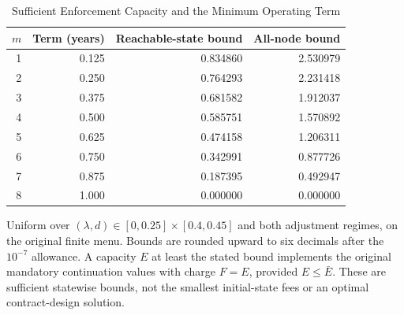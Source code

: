 \begin{table}[tbp]
\centering\small
\caption{Sufficient Enforcement Capacity and the Minimum Operating Term}
\label{tab:r9_enforcement}
\begin{tabular}{rrrr}
\toprule
$m$ & Term (years) & Reachable-state bound & All-node bound \\
\midrule
1 & 0.125 & 0.834860 & 2.530979 \\
2 & 0.250 & 0.764293 & 2.231418 \\
3 & 0.375 & 0.681582 & 1.912037 \\
4 & 0.500 & 0.585751 & 1.570892 \\
5 & 0.625 & 0.474158 & 1.206311 \\
6 & 0.750 & 0.342991 & 0.877726 \\
7 & 0.875 & 0.187395 & 0.492947 \\
8 & 1.000 & 0.000000 & 0.000000 \\
\bottomrule
\end{tabular}
\begin{minipage}{0.98\textwidth}\footnotesize\medskip
Uniform over $(\lambda,d)\in[0,0.25]\times[0.4,0.45]$ and both adjustment regimes, on the original finite menu. Bounds are rounded upward to six decimals after the $10^{-7}$ allowance. A capacity $E$ at least the stated bound implements the original mandatory continuation values with charge $F=E$, provided $E\leq\bar E$. These are sufficient statewise bounds, not the smallest initial-state fees or an optimal contract-design solution.
\end{minipage}
\end{table}
